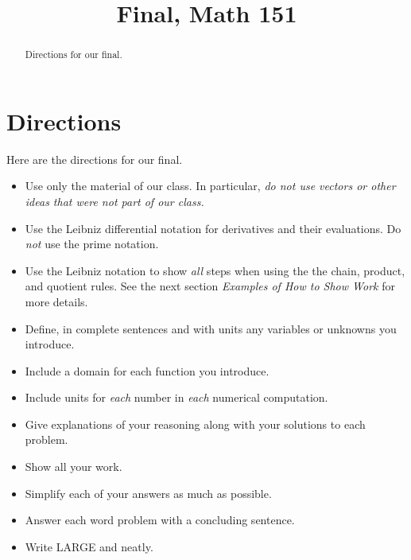 \documentclass{ximera}
\title{Final, Math 151}
\begin{document}
\begin{abstract}
Directions for our final.
\end{abstract}
\maketitle

\section{Directions}

Here are the directions for our final.

\begin{itemize}
\item Use only the material of our class. In particular, \emph{do not use vectors or other ideas that were not part of our class.}

\item Use the Leibniz differential notation for derivatives and their evaluations. Do \emph{not} use the prime notation.

\item Use the Leibniz notation to show \emph{all} steps when using the the chain, product, and quotient rules. See the next section \emph{Examples of How to Show Work} for more details.

\item Define, in complete sentences and with units any variables or unknowns you introduce.

\item Include a domain for each function you introduce.

\item Include units for \emph{each} number in \emph{each} numerical computation.

\item Give explanations of your reasoning along with your solutions to each problem.

\item Show all your work.

\item Simplify each of your answers as much as possible.

\item Answer each word problem with a concluding sentence.


\item Write LARGE and neatly.


\end{itemize}
\end{document}
